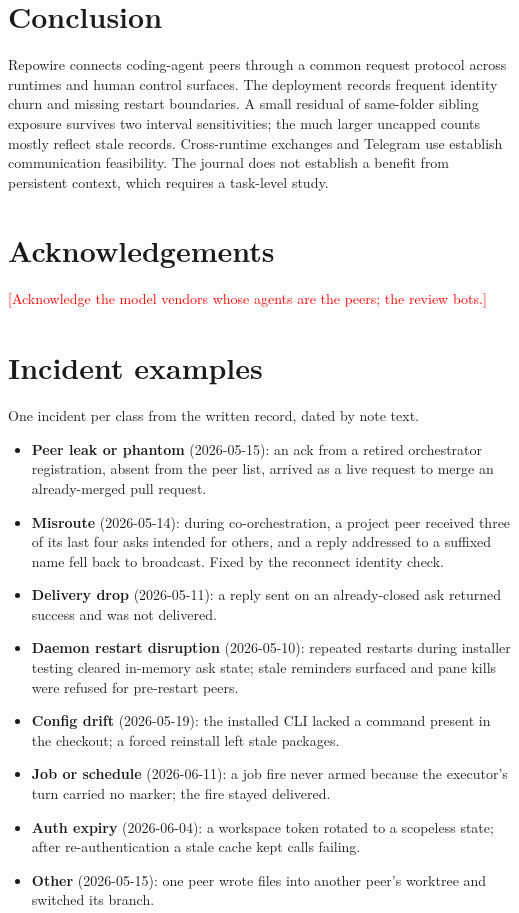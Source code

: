 \documentclass[10pt,twocolumn]{article}
\newcommand{\todo}[1]{\textcolor{red}{[#1]}}
\newcommand{\sys}{Repowire}
\begin{document}
\section{Conclusion}

\sys{} connects coding-agent peers through a common request protocol across runtimes and human control surfaces. The deployment records frequent identity churn and missing restart boundaries. A small residual of same-folder sibling exposure survives two interval sensitivities; the much larger uncapped counts mostly reflect stale records. Cross-runtime exchanges and Telegram use establish communication feasibility. The journal does not establish a benefit from persistent context, which requires a task-level study.

\section*{Acknowledgements}
\todo{Acknowledge the model vendors whose agents are the peers; the review bots.}




\newpage
\appendix
\onecolumn

\section{Incident examples}
\label{app:incidents}

One incident per class from the written record, dated by note text.
\begin{itemize}
\item \textbf{Peer leak or phantom} (2026-05-15): an ack from a retired orchestrator registration, absent from the peer list, arrived as a live request to merge an already-merged pull request.
\item \textbf{Misroute} (2026-05-14): during co-orchestration, a project peer received three of its last four asks intended for others, and a reply addressed to a suffixed name fell back to broadcast. Fixed by the reconnect identity check.
\item \textbf{Delivery drop} (2026-05-11): a reply sent on an already-closed ask returned success and was not delivered.
\item \textbf{Daemon restart disruption} (2026-05-10): repeated restarts during installer testing cleared in-memory ask state; stale reminders surfaced and pane kills were refused for pre-restart peers.
\item \textbf{Config drift} (2026-05-19): the installed CLI lacked a command present in the checkout; a forced reinstall left stale packages.
\item \textbf{Job or schedule} (2026-06-11): a job fire never armed because the executor's turn carried no marker; the fire stayed delivered.
\item \textbf{Auth expiry} (2026-06-04): a workspace token rotated to a scopeless state; after re-authentication a stale cache kept calls failing.
\item \textbf{Other} (2026-05-15): one peer wrote files into another peer's worktree and switched its branch.
\end{itemize}
\end{document}
